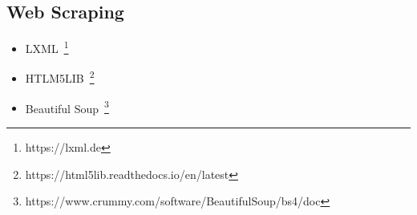 \subsection{Web Scraping}

\begin{itemize}
    \item LXML~\footnote{https://lxml.de}
    \item HTLM5LIB~\footnote{https://html5lib.readthedocs.io/en/latest}
    \item Beautiful Soup~\footnote{https://www.crummy.com/software/BeautifulSoup/bs4/doc}
\end{itemize}
